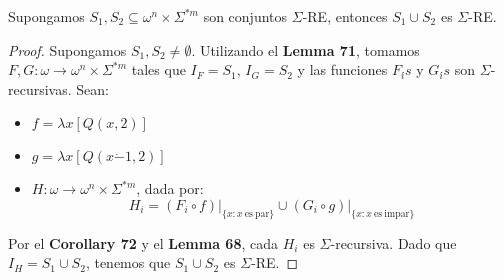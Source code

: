   \begin{corollary}
    \PN Supongamos $S_{1}, S_{2} \subseteq \omega^{n} \times \Sigma^{\ast m}$ son conjuntos $\Sigma$-RE, entonces
    $S_{1} \cup S_{2}$ es $\Sigma$-RE.
  \end{corollary}
  \begin{proof}
    \PN Supongamos $S_{1}, S_{2} \neq \emptyset$. Utilizando el \textbf{Lemma 71}, tomamos $F, G: \omega \rightarrow
    \omega^{n} \times \Sigma^{\ast m}$ tales que $I_{F}=S_{1}$, $I_{G}=S_{2}$ y las funciones $F_{i} {\acute{}} s$ y
    $G_{i} {\acute{}} s$ son $\Sigma $-recursivas. Sean:

    \begin{itemize}
      \item $f = \lambda x\left[Q(x,2)\right]$
      \item $g = \lambda x\left[Q(x\dot{-}1,2)\right]$
      \item $H: \omega \rightarrow \omega^{n} \times \Sigma^{\ast m}$, dada por:
        \[
          H_{i} = (F_{i} \circ f) \mathrm{\mid}_{\{x:x\mathrm{\ es\ par}\}} \cup (G_{i}\circ g)
          \mathrm{\mid}_{\{x:x\mathrm{\ es\ impar}\}}
        \]
    \end{itemize}

    \PN Por el \textbf{Corollary 72} y el \textbf{Lemma 68}, cada $H_{i}$ es $\Sigma$-recursiva. Dado que
    $I_{H} = S_{1} \cup S_{2}$, tenemos que $S_{1} \cup S_{2}$ es $\Sigma$-RE.
  \end{proof}

